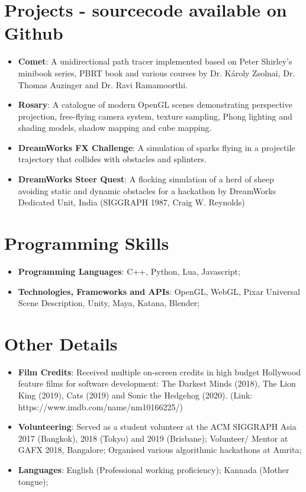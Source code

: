\documentclass[a4paper,11pt]{article}
\newcommand{\resumeItem}[2]{
  \item\small{
    \textbf{#1}{: #2 \vspace{-2pt}}
  }
}
\newcommand{\resumeSubItem}[2]{
  \resumeItem{#1}{#2}
  \vspace{-4pt}
}
\newcommand{\resumeSubHeadingListStart}{
  \begin{itemize}[leftmargin=*]
}
\newcommand{\resumeSubHeadingListEnd}{
  \end{itemize}
}
\begin{document}
  \section{Projects - sourcecode available on Github}
    \resumeSubHeadingListStart
      \resumeSubItem{Comet}
        {A unidirectional path tracer implemented based on Peter Shirley's minibook series, PBRT book and various courses by Dr. Károly Zsolnai, Dr. Thomas Auzinger and Dr. Ravi Ramamoorthi. }
      \resumeSubItem{Rosary}
        {A catalogue of modern OpenGL scenes demonstrating perspective projection, free-flying camera system, texture sampling, Phong lighting and shading models, shadow mapping and cube mapping.}
      \resumeSubItem{DreamWorks FX Challenge}
        {A simulation of sparks flying in a projectile trajectory that collides with obstacles and splinters.}
      \resumeSubItem{DreamWorks Steer Quest}
        {A flocking simulation of a herd of sheep avoiding static and dynamic obstacles for a hackathon by DreamWorks Dedicated Unit, India (SIGGRAPH 1987, Craig W. Reynolds)}
    \resumeSubHeadingListEnd

  \section{Programming  Skills}
    \resumeSubHeadingListStart
      \resumeSubItem{Programming Languages}
        {C++, Python, Lua, Javascript;}
      \resumeSubItem{Technologies, Frameworks and APIs}
        {OpenGL, WebGL, Pixar Universal Scene Description, Unity, Maya, Katana, Blender;}
    \resumeSubHeadingListEnd

  \section{Other Details}
    \resumeSubHeadingListStart
      \resumeSubItem{Film Credits}
        {Received multiple on-screen credits in high budget Hollywood feature films for software development: The Darkest Minds (2018), The Lion King (2019), Cats (2019) and Sonic the Hedgehog (2020). (Link: https://www.imdb.com/name/nm10166225/)}
      \resumeSubItem{Volunteering}
        {Served as a student volunteer at the ACM SIGGRAPH Asia 2017 (Bangkok), 2018 (Tokyo) and 2019 (Brisbane);
          Volunteer/ Mentor at GAFX 2018, Bangalore;
          Organised various algorithmic hackathons at Amrita; }
      \resumeSubItem{Languages}
        {English (Professional working proficiency); Kannada (Mother tongue);}
    \resumeSubHeadingListEnd

\end{document}

